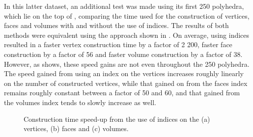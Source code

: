 In this latter dataset, an additional test was made using its first 250 polyhedra, which lie on the top of , comparing the time used for the construction of vertices, faces and volumes with and without the use of indices.
The results of both methods were equivalent using the approach shown in .
On average, using indices resulted in a faster vertex construction time by a factor of 2 200, faster face construction by a factor of 56 and faster volume construction by a factor of 38.
However, as  shows, these speed gains are not even throughout the 250 polyhedra.
The speed gained from using an index on the vertices increases roughly linearly on the number of constructed vertices, while that gained on from the faces index remains roughly constant between a factor of 50 and 60, and that gained from the volumes index tends to slowly increase as well.
\begin{figure}[tbp]
\centering
{}
\caption[Construction time speed-up from the use of indices]{Construction time speed-up from the use of indices on the (a) vertices, (b) faces and (c) volumes.}
\label{fig:construction-times}
\end{figure}


